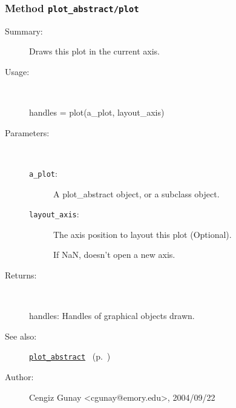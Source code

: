 \subsubsection[Method \texttt{plot}]{Method \texttt{plot\_abstract/plot}}%
%
\label{ref_plot_abstract__plot}%
\hypertarget{ref_plot_abstract__plot}{}%
\begin{description}
\item[Summary:]Draws this plot in the current axis.
%
\item[Usage:]~%
\begin{lyxcode}%
handles = plot(a\_plot, layout\_axis)
%
\end{lyxcode}%
%
%
\item[Parameters:]~
\begin{description}%
\item[\texttt{a\_plot}:]
 A plot\_abstract object, or a subclass object.
\item[\texttt{layout\_axis}:]
 The axis position to layout this plot (Optional). 

If NaN, doesn't open a new axis.
\end{description}%
%
\item[Returns:
]~

	handles: Handles of graphical objects drawn.
%
%
\item[See also:]%
\hyperlink{ref_plot_abstract}{\texttt{plot\_abstract}}%
\ (p.~\pageref{ref_plot_abstract})%
%
%
\item[Author:]%
Cengiz Gunay <cgunay@emory.edu>, 2004/09/22
%
\end{description}
\methodline%
